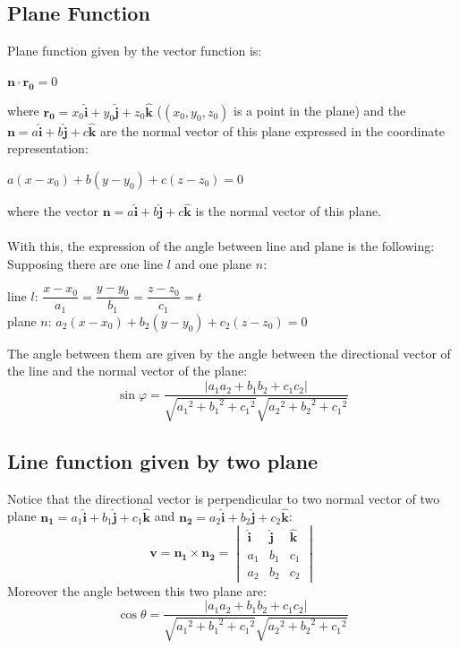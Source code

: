 \documentclass[UTF8,a4paper, 10pt, openany]{book}
\begin{document}
\subsection{Plane Function}
Plane function given by the vector function is:
\begin{center}
$\mathbf{n}\cdot \mathbf{r_0}=0$\\
\end{center}
where $\mathbf{r_0}=x_0\mathbf{\hat{i}}+y_0\mathbf{\hat{j}}+z_0\mathbf{\hat{k}}$ ($(x_0,y_0,z_0)$ is a point in the plane) and the $\mathbf{n}=a\mathbf{\hat{i}}+b\mathbf{\hat{j}}+c\mathbf{\hat{k}}$ are the normal vector of this plane
expressed in the coordinate representation:
\begin{center}
$a(x-x_0)+b(y-y_0)+c(z-z_0)=0$
\end{center}
where the vector $\mathbf{n}=a\mathbf{\hat{i}}+b\mathbf{\hat{j}}+c\mathbf{\hat{k}}$ is the normal vector of this plane.\\ \\
With this, the expression of the angle between line and plane is the following:\\
Supposing there are one line $l$ and one plane $n$:
\begin{center}
line $l$: $\dfrac{x-x_0}{a_1}=\dfrac{y-y_0}{b_1}=\dfrac{z-z_0}{c_1}=t$\\
plane $n$: $a_2(x-x_0)+b_2(y-y_0)+c_2(z-z_0)=0$
\end{center}
The angle between them are given by the angle between the directional vector of the line and the normal vector of the plane:
\begin{equation}
\boxed{\sin \varphi =\dfrac{|a_1a_2+b_1b_2+c_1c_2|}{\sqrt{{a_1}^2+{b_1}^2+{c_1}^2}\sqrt{{a_2}^2+{b_2}^2+{c_1}^2}}}
\end{equation}

\subsection{Line function given by two plane}
Notice that the directional vector is perpendicular to two normal vector of two plane $\mathbf{n_1}=a_1\mathbf{\hat{i}}+b_1\mathbf{\hat{j}}+c_1\mathbf{\hat{k}}$ and $\mathbf{n_2}=a_2\mathbf{\hat{i}}+b_2\mathbf{\hat{j}}+c_2\mathbf{\hat{k}}$:
\begin{equation}
\boxed{\mathbf{v}=\mathbf{n_1}\times \mathbf{n_2}=
\begin{vmatrix}
\mathbf{\hat{i}} & \mathbf{\hat{j}} & \mathbf{\hat{k}}\\
a_1 & b_1 & c_1 \\
a_2 & b_2 & c_2
\end{vmatrix}
}
\end{equation}
Moreover the angle between this two plane are:
\begin{equation}
\boxed{\cos \theta =\dfrac{|a_1a_2+b_1b_2+c_1c_2|}{\sqrt{{a_1}^2+{b_1}^2+{c_1}^2}\sqrt{{a_2}^2+{b_2}^2+{c_1}^2}}}
\end{equation}
\end{document}
